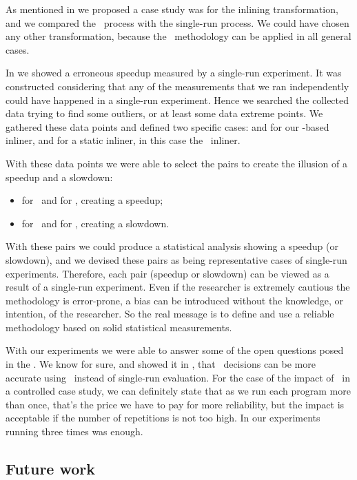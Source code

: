 
As mentioned in  we proposed a case study was for the inlining transformation, and we compared the \CP\ process with the single-run process. We could have chosen any other transformation, because the \CP\ methodology can be applied in all general cases.

In  we showed a erroneous speedup measured by a single-run experiment. It was constructed considering that any of the measurements that we ran independently could have happened in a single-run experiment. Hence we searched the collected data trying to find some outliers, or at least some data extreme points. We gathered these data points and defined two specific cases:  and  for our \FDO-based inliner, and for a static inliner, in this case the \llvm\ inliner.

With these data points we were able to select the pairs to create the illusion of a speedup and a slowdown:
\begin{itemize}
 \item {} for \FDO\ and  for \llvm, creating a speedup;
 \item {} for \FDO\ and  for \llvm, creating a slowdown.
\end{itemize}

With these pairs we could produce a statistical analysis showing a speedup (or slowdown), and we devised these pairs as being representative cases of single-run experiments. Therefore, each pair (speedup or slowdown) can be viewed as a result of a single-run experiment. Even if the researcher is extremely cautious the methodology is error-prone, a bias can be introduced without the knowledge, or intention, of the researcher. So the real message is to define and use a reliable methodology based on solid statistical measurements.

With our experiments we were able to answer some of the open questions posed in the . We know for sure, and showed it in , that \FDI\ decisions can be more accurate using \CP\ instead of single-run evaluation. For the case of the impact of \CP\ in a controlled case study, we can definitely state that as we run each program more than once, that's the price we have to pay for more reliability, but the impact is acceptable if the number of repetitions is not too high. In our experiments running three times was enough.

\subsection{Future work}

